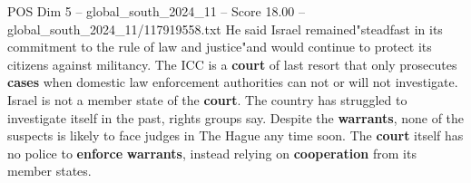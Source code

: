 \begin{textsample}{POS Dim 5 – global\_south\_2024\_11 – Score 18.00 – global\_south\_2024\_11/117919558.txt}
He said Israel remained"steadfast in its commitment to the rule of law and justice"and would continue to protect its citizens against militancy.
The ICC is a \textbf{court} of last resort that only prosecutes \textbf{cases} when domestic law enforcement authorities can not or will not investigate.
Israel is not a member state of the \textbf{court}.
The country has struggled to investigate itself in the past, rights groups say.
Despite the \textbf{warrants}, none of the suspects is likely to face judges in The Hague any time soon.
The \textbf{court} itself has no police to \textbf{enforce} \textbf{warrants}, instead relying on \textbf{cooperation} from its member states.

\end{textsample}
